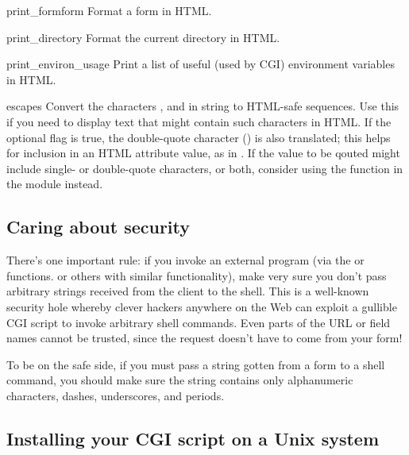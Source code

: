 \begin{funcdesc}{print_form}{form}
Format a form in HTML.
\end{funcdesc}

\begin{funcdesc}{print_directory}{}
Format the current directory in HTML.
\end{funcdesc}

\begin{funcdesc}{print_environ_usage}{}
Print a list of useful (used by CGI) environment variables in
HTML.
\end{funcdesc}

\begin{funcdesc}{escape}{s}
Convert the characters
\character{\&}, \character{<} and \character{>} in string  to
HTML-safe sequences.  Use this if you need to display text that might
contain such characters in HTML.  If the optional flag  is
true, the double-quote character () is also translated;
this helps for inclusion in an HTML attribute value, as in .  If the value to be qouted might include single- or
double-quote characters, or both, consider using the
 function in the 
module instead.
\end{funcdesc}


\subsection{Caring about security}

There's one important rule: if you invoke an external program (via the
 or  functions. or others
with similar functionality), make very sure you don't pass arbitrary
strings received from the client to the shell.  This is a well-known
security hole whereby clever hackers anywhere on the Web can exploit a
gullible CGI script to invoke arbitrary shell commands.  Even parts of
the URL or field names cannot be trusted, since the request doesn't
have to come from your form!

To be on the safe side, if you must pass a string gotten from a form
to a shell command, you should make sure the string contains only
alphanumeric characters, dashes, underscores, and periods.


\subsection{Installing your CGI script on a Unix system}

